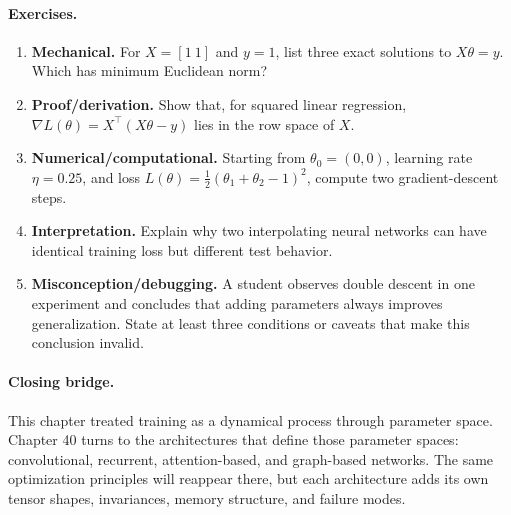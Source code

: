 \paragraph{Exercises.}
\begin{enumerate}[label=\textbf{39.4.\arabic*.}, leftmargin=*]
\item \textbf{Mechanical.} For \(X=[1\ 1]\) and \(y=1\), list three exact solutions to \(X\theta=y\). Which has minimum Euclidean norm?
\item \textbf{Proof/derivation.} Show that, for squared linear regression, \(\nabla L(\theta)=X^\top(X\theta-y)\) lies in the row space of \(X\).
\item \textbf{Numerical/computational.} Starting from \(\theta_0=(0,0)\), learning rate \(\eta=0.25\), and loss \(L(\theta)=\frac12(\theta_1+\theta_2-1)^2\), compute two gradient-descent steps.
\item \textbf{Interpretation.} Explain why two interpolating neural networks can have identical training loss but different test behavior.
\item \textbf{Misconception/debugging.} A student observes double descent in one experiment and concludes that adding parameters always improves generalization. State at least three conditions or caveats that make this conclusion invalid.
\end{enumerate}

\paragraph{Closing bridge.}
This chapter treated training as a dynamical process through parameter space. Chapter 40 turns to the architectures that define those parameter spaces: convolutional, recurrent, attention-based, and graph-based networks. The same optimization principles will reappear there, but each architecture adds its own tensor shapes, invariances, memory structure, and failure modes.

\clearpage
